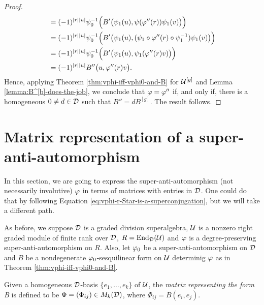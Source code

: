 \begin{proof}
\begin{align*}
        &= (-1)^{|r||u|} \psi_0^{-1} \Big( B' \big( \psi_1(u), \psi (\varphi''(r)) \psi_1(v) \big) \Big)\\
        &= (-1)^{|r||u|} \psi_0^{-1} \Big( B' \big( \psi_1(u), (\psi_1 \circ \varphi''(r) \circ \psi_1^{-1}) \psi_1(v) \big) \Big)\\
        &= (-1)^{|r||u|} \psi_0^{-1} \Big( B' \big( \psi_1(u), \psi_1 (\varphi''(r) v) \big) \Big)\\
        &= (-1)^{|r||u|} B'' \big( u, \varphi''(r) v\big).
    \end{align*}
    Hence, applying Theorem \ref{thm:vphi-iff-vphi0-and-B} for $\mathcal U^{[g]}$ and Lemma \ref{lemma:B^[b]-does-the-job}, we conclude that $\varphi = \varphi''$ if, and only if, there is a homogeneous $0 \neq d \in \mathcal{D}$ such that $B'' = dB^{[g]}$. 
    The result follows. 
\end{proof}


\section{Matrix representation of a su\-per\--anti\--auto\-mor\-phism}

In this section, we are going to express the super-anti-automorphism (not necessarily involutive) $\varphi$ in terms of matrices with entries in $\mathcal{D}$. 
One could do that by following Equation \eqref{eq:vphi-r-Star-is-a-superconjugation}, but we will take a different path. 

As before, we suppose $\mathcal{D}$ is a graded division superalgebra, $\mathcal U$ is a nonzero right graded module of finite rank over $\mathcal{D}$, $R = \operatorname{End}_{\mathcal{D}} (\mathcal U)$ and $\varphi$ is a degree-preserving super-anti-automorphism on $R$. 
Also, let $\varphi_0$ be a super-anti-automorphism on $\mathcal{D}$ and $B$ be a nondegenerate $\varphi_0$-sesquilinear form on $\mathcal U$ determinig $\varphi$ as in Theorem \ref{thm:vphi-iff-vphi0-and-B}.

\begin{defi}\label{def:matrix-representing-B}
    Given a homogeneous $\mathcal{D}$-basis $\{e_1, \ldots, e_k\}$ of $\mathcal U$, the \emph{matrix representing the form B} is defined to be $\Phi = (\Phi_{ij}) \in M_k(\mathcal{D})$, where $\Phi_{ij} = B(e_i, e_j)$.
\end{defi}

